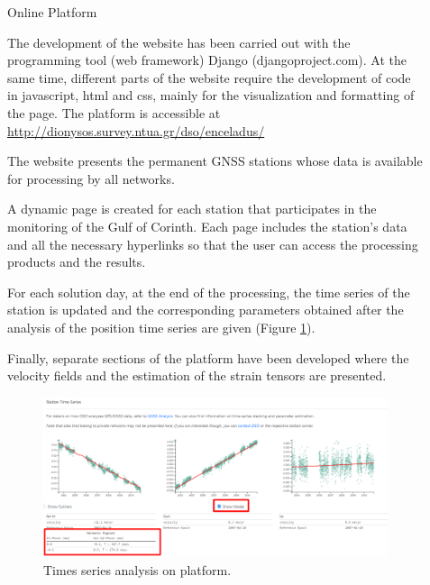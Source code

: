 \documentclass[final,a0,portrait]{beamer}
\newlength{\sepwid}
\newlength{\onecolwid}
\begin{document}
\begin{frame}[t]
\begin{columns}[t]
\begin{column}{\onecolwid}
\end{column} %

\begin{column}{\sepwid}\end{column} %


\begin{column}{\onecolwid} %


\begin{block}{Online Platform}
{\small
The development of the website has been carried out with the programming tool (web framework) Django (djangoproject.com). At the same time, different parts of the website require the development of code in javascript, html and css, mainly for the visualization and formatting of the page. The platform is accessible at \url{http://dionysos.survey.ntua.gr/dso/enceladus/} 

The website presents the permanent GNSS stations whose data is available for processing by all networks.

A dynamic page is created for each station that participates in the monitoring of the Gulf of Corinth. Each page includes the station's data and all the necessary hyperlinks so that the user can access the processing products and the results.

For each solution day, at the end of the processing, the time series of the station is updated and the corresponding parameters obtained after the analysis of the position time series are given (Figure \ref{fig:vels}).

Finally, separate sections of the platform have been developed where the velocity fields and the estimation of the strain tensors are presented.

}

\begin{figure}
    \includegraphics[width=1\onecolwid]{gsg2022_ts1.png}
    \caption{Times series analysis on platform.}
    \label{fig:vels}
\end{figure}


\end{block}
\end{column}
\end{columns}
\end{frame}
\end{document}
